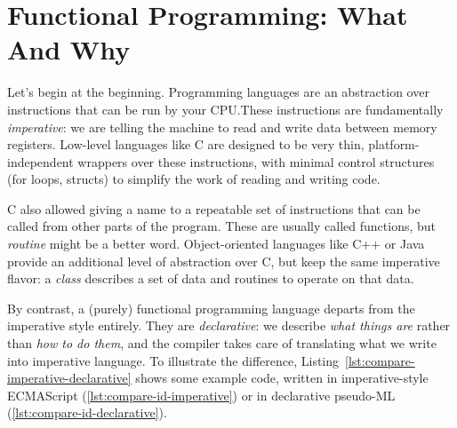 \section{Functional Programming: What And Why}

Let's begin at the beginning. Programming languages are an abstraction over instructions that can be run by your CPU.\@ These instructions are fundamentally \emph{imperative}: we are telling the machine to read and write data between memory registers. Low-level languages like C are designed to be very thin, platform-independent wrappers over these instructions, with minimal control structures (for loops, structs) to simplify the work of reading and writing code.

C also allowed giving a name to a repeatable set of instructions that can be called from other parts of the program. These are usually called functions, but \emph{routine} might be a better word. Object-oriented languages like C++ or Java provide an additional level of abstraction over C, but keep the same imperative flavor: a \emph{class} describes a set of data and routines to operate on that data.

By contrast, a (purely) functional programming language departs from the imperative style entirely. They are \emph{declarative}: we describe \emph{what things are} rather than \emph{how to do them}, and the compiler takes care of translating what we write into imperative language. To illustrate the difference, Listing~\ref{lst:compare-imperative-declarative} shows some example code, written in imperative-style ECMAScript (\ref{lst:compare-id-imperative}) or in declarative pseudo-ML (\ref{lst:compare-id-declarative}). 

